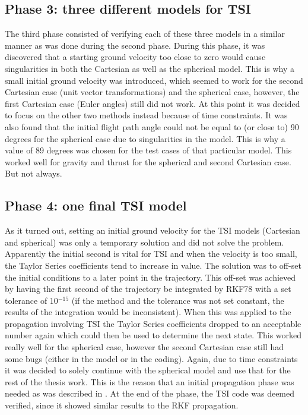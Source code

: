 \subsection{Phase 3: three different models for \ac{TSI}}
\label{subsec:phase3com}
The third phase consisted of verifying each of these three models in a similar manner as was done during the second phase. During this phase, it was discovered that a starting ground velocity too close to zero would cause singularities in both the Cartesian as well as the spherical model. This is why a small initial ground velocity was introduced, which seemed to work for the second Cartesian case (unit vector transformations) and the spherical case, however, the first Cartesian case (Euler angles) still did not work. At this point it was decided to focus on the other two methods instead because of time constraints. It was also found that the initial flight path angle could not be equal to (or close to) 90 degrees for the spherical case due to singularities in the model. This is why a value of 89 degrees was chosen for the test cases of that particular model. This worked well for gravity and thrust for the spherical and second Cartesian case. But not always.

\subsection{Phase 4: one final \ac{TSI} model}
\label{subsec:phase4com}
As it turned out, setting an initial ground velocity for the \ac{TSI} models (Cartesian and spherical) was only a temporary solution and did not solve the problem. Apparently the initial second is vital for \ac{TSI} and when the velocity is too small, the Taylor Series coefficients tend to increase in value. The solution was to off-set the initial conditions to a later point in the trajectory. This off-set was achieved by having the first second of the trajectory be integrated by \ac{RKF78} with a set tolerance of 10$^{-15}$ (if the method and the tolerance was not set constant, the results of the integration would be inconsistent). When this was applied to the propagation involving \ac{TSI} the Taylor Series coefficients dropped to an acceptable number again which could then be used to determine the next state. This worked really well for the spherical case, however the second Cartesian case still had some bugs (either in the model or in the coding). Again, due to time constraints it was decided to solely continue with the spherical model and use that for the rest of the thesis work. This is the reason that an initial propagation phase was needed as was described in . At the end of the phase, the \ac{TSI} code was deemed verified, since it showed similar results to the \ac{RKF} propagation. 

